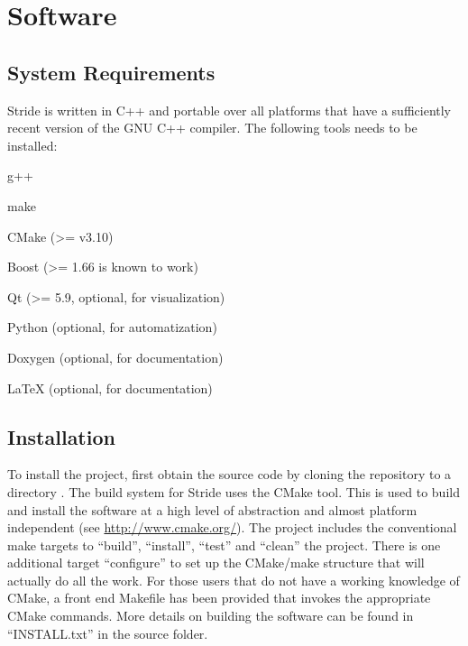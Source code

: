 \chapter{Software}
\label{chap:software}


\section{System Requirements}
\label{section:system}

Stride is written in C++ and portable over all platforms that have a sufficiently recent version of the GNU C++ compiler.
The following tools needs to be installed:
\begin{compactitem}
    \item g++
    \item make
    \item CMake (\textgreater = v3.10)
    \item Boost (\textgreater = 1.66 is known to work)
    \item Qt (\textgreater = 5.9, optional, for visualization)
    \item Python (optional, for automatization)
    \item Doxygen (optional, for documentation)
    \item LaTeX (optional, for documentation)
\end{compactitem}


\section{Installation}
\label{section:Installation}

To install the project, first obtain the source code by cloning the repository to a directory .
The build system for Stride uses the CMake tool. This is used to build and install the software at a high level of abstraction and almost platform independent (see \url{http://www.cmake.org/}).
The project includes the conventional make targets to ``build'', ``install'', ``test'' and ``clean'' the project. There is one additional target ``configure'' to set up the CMake/make structure that will actually do all the work.
For those users that do not have a working knowledge of CMake, a front end Makefile has been provided that invokes the appropriate CMake commands.
More details on building the software can be found in ``INSTALL.txt'' in the source folder.


